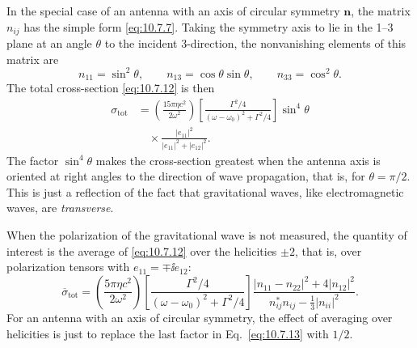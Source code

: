 In the special case of an antenna with an axis of circular symmetry
\(\mathbf{n}\), the matrix \(n_{ij}\) has the simple form
\eqref{eq:10.7.7}. Taking the symmetry axis to lie in the 1--3 plane at an
angle \(\theta\) to the incident 3-direction, the nonvanishing elements of
this matrix are
\[
  n_{11}=\sin^2\theta,
  \qquad
  n_{13}=\cos\theta\sin\theta,
  \qquad
  n_{33}=\cos^2\theta.
\]
The total cross-section \eqref{eq:10.7.12} is then
\begin{equation}
  \begin{split}
  \sigma_{\mathrm{tot}}
  &=
  \left(\frac{15\pi\eta c^2}{2\omega^2}\right)
  \left[
    \frac{\Gamma^2/4}
    {(\omega-\omega_0)^2+\Gamma^2/4}
  \right]
  \sin^4\theta
  \\
  &\quad\times
  \frac{\lvert e_{11}\rvert^2}
  {\lvert e_{11}\rvert^2+\lvert e_{12}\rvert^2}.
  \end{split}
  \tag{10.7.13}\label{eq:10.7.13}
\end{equation}
The factor \(\sin^4\theta\) makes the cross-section greatest when the antenna
axis is oriented at right angles to the direction of wave propagation, that
is, for \(\theta=\pi/2\). This is just a reflection of the fact that
gravitational waves, like electromagnetic waves, are \emph{transverse}.

When the polarization of the gravitational wave is not measured, the quantity
of interest is the average of \eqref{eq:10.7.12} over the helicities
\(\pm2\), that is, over polarization tensors with
\(e_{11}=\mp\ii e_{12}\):
\begin{equation}
  \overline{\sigma}_{\mathrm{tot}}
  =
  \left(\frac{5\pi\eta c^2}{2\omega^2}\right)
  \left[
    \frac{\Gamma^2/4}
    {(\omega-\omega_0)^2+\Gamma^2/4}
  \right]
  \frac{
    \lvert n_{11}-n_{22}\rvert^2+4\lvert n_{12}\rvert^2
  }{
    n_{ij}^*n_{ij}-\frac13\lvert n_{ii}\rvert^2
  }.
  \tag{10.7.14}\label{eq:10.7.14}
\end{equation}
For an antenna with an axis of circular symmetry, the effect of averaging over
helicities is just to replace the last factor in Eq.~\eqref{eq:10.7.13} with
\(1/2\).

